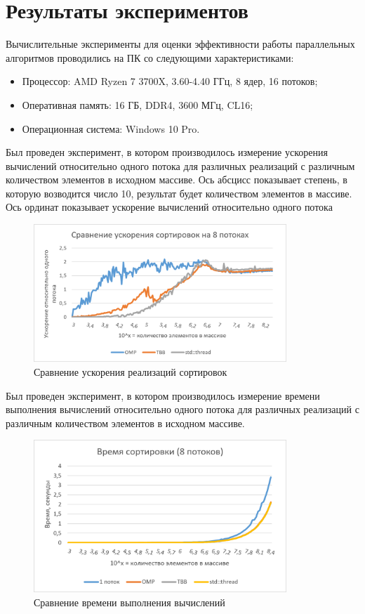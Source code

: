 \documentclass{report}
\begin{document}
\section*{Результаты экспериментов}
Вычислительные эксперименты для оценки эффективности работы параллельных алгоритмов проводились на ПК со следующими характеристиками:
\begin{itemize}
    \item Процессор: AMD Ryzen 7 3700X, 3.60-4.40 ГГц, 8 ядер, 16 потоков;
    \item Оперативная память: 16 ГБ, DDR4, 3600 МГц, CL16;
    \item Операционная система: Windows 10 Pro.
\end{itemize}
\par Был проведен эксперимент, в котором производилось измерение ускорения вычислений относительно одного потока для различных реализаций с различным количеством элементов в исходном массиве. Ось абсцисс показывает степень, в которую возводится число 10, результат будет количеством элементов в массиве. Ось ординат показывает ускорение вычислений относительно одного потока
\begin{figure}[H]
    \centering
    \includegraphics[width=0.85\textwidth]{images/boost_comparsion_8thrd.png}
    \caption{Сравнение ускорения реализаций сортировок}
    \label{fig:my_label_1}
\end{figure}
\par Был проведен эксперимент, в котором производилось измерение времени выполнения вычислений относительно одного потока для различных реализаций с различным количеством элементов в исходном массиве.
\begin{figure}[H]
    \centering
    \includegraphics[width=0.85\textwidth]{images/sort_time_8thrd.png}
    \caption{Сравнение времени выполнения вычислений}
    \label{fig:my_label_2}
\end{figure}
\end{document}
